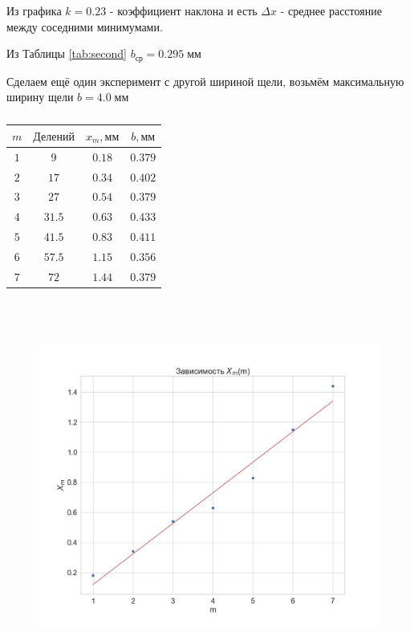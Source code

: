\documentclass[a4paper, 12pt]{article}
\begin{document}
Из графика  $k = 0.23$ - коэффициент наклона и есть $\Delta x$ - среднее расстояние между соседними минимумами.

Из Таблицы \ref{tab:second} $b_{\text{ср}} = 0.295\; \text{мм}$ 

Сделаем ещё один эксперимент с другой шириной щели, возьмём максимальную ширину щели $b = 4.0\; \text{мм}$

\begin{table}[H]
\begin{center}
\begin{tabular}{|c|c|c|c|}\hline
$m$ & $\text{Делений}$ & $x_m, \text{мм}$ & $b, \text{мм}$ \\\hline
$1$ & $9$  & $0.18$  & $ 0.379$ \\\hline
$2$ & $17$ & $0.34$  & $0.402$ \\\hline
$3$ & $27$ & $0.54$  & $0.379$ \\\hline
$4$ & $31.5$ & $0.63$  & $0.433$ \\\hline
$5$ & $41.5$ & $0.83$  & $0.411$ \\\hline
$6$ & $57.5$ & $1.15$  & $0.356$ \\\hline
$7$ & $72$ & $1.44$  & $0.379$ \\\hline
\end{tabular}\\~\\
\end{center}
\caption{\label{tab:third}}
\end{table}

\begin{figure}[H]
    \centering
    \includegraphics[width=1\textwidth]{Fraunhofer1.jpg}
\end{figure}
\end{document}
